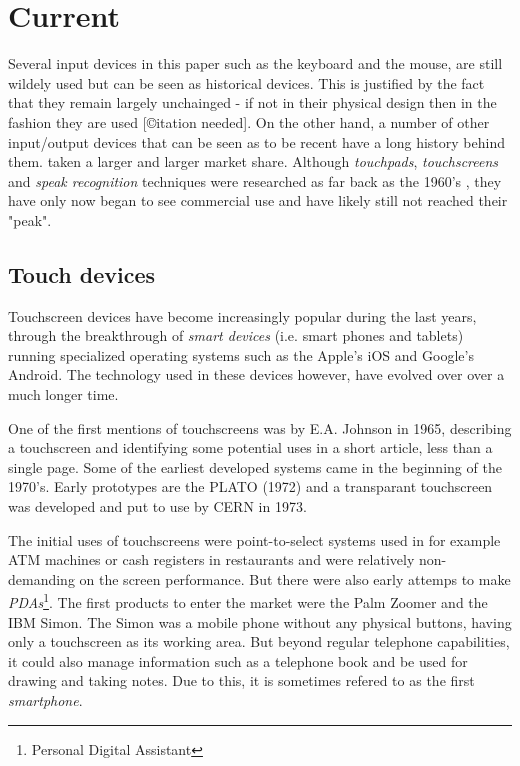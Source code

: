 \section{Current}


Several input devices in this paper such as the keyboard and the mouse, are still wildely used but can be seen as historical devices. This is justified by the fact that they remain largely unchainged - if not in their physical design then in the fashion they are used [©itation needed]. On the other hand, a number of other input/output devices that can be seen as to be recent have a long history behind them. taken a larger and larger market share. Although \emph{touchpads}, \emph{touchscreens} and \emph{speak recognition} techniques were researched as far back as the 1960's \cite{buxton}\cite{shoebox}, they have only now began to see commercial use and have likely still not reached their "peak". 


\subsection{Touch devices}
Touchscreen devices have become increasingly popular during the last years, through the breakthrough of \emph{smart devices} (i.e. smart phones and tablets) running specialized operating systems such as the Apple's iOS and Google's Android. The technology used in these devices however, have evolved over over a much longer time.

One of the first mentions of touchscreens was by E.A. Johnson in 1965, describing a touchscreen and identifying some potential uses in a short article, less than a single page\cite{4205802}. Some of the earliest developed systems came in the beginning of the 1970's. Early prototypes are the PLATO \cite{buxton} (1972) and a transparant touchscreen was developed and put to use by CERN in 1973\cite{cern}.


The initial uses of touchscreens were point-to-select systems used in for example ATM machines or cash registers in restaurants and were relatively non-demanding on the screen performance\cite{buxton}. But there were also early attemps to make \emph{PDAs}\footnote{Personal Digital Assistant}. The first products to enter the market were the Palm Zoomer and the IBM Simon. The Simon was a mobile phone without any physical buttons, having only a touchscreen as its working area. But beyond regular telephone capabilities, it could also manage information such as a telephone book and be used for drawing and taking notes. Due to this, it is sometimes refered to as the first \emph{smartphone}\cite{buxton}.

